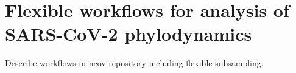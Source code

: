 \chapter{Flexible workflows for analysis of SARS-CoV-2 phylodynamics}

Describe workflows in ncov repository including flexible subsampling.
